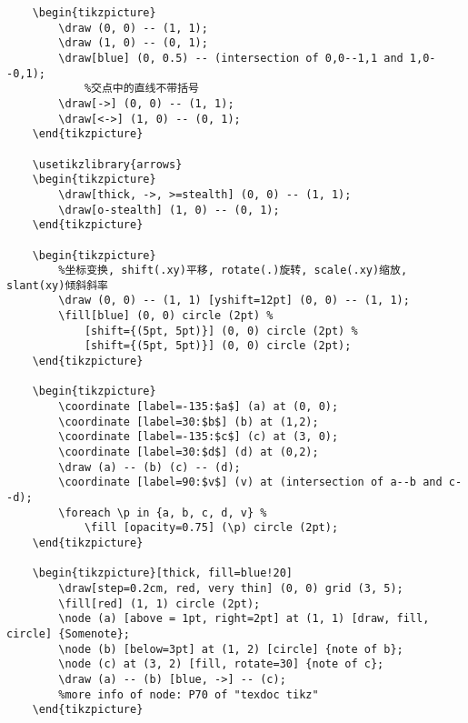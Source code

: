 \documentclass[12pt]{ctexart}
\begin{document}
\begin{verbatim}
    \begin{tikzpicture}
        \draw (0, 0) -- (1, 1);
        \draw (1, 0) -- (0, 1);
        \draw[blue] (0, 0.5) -- (intersection of 0,0--1,1 and 1,0--0,1);
            %交点中的直线不带括号
        \draw[->] (0, 0) -- (1, 1);
        \draw[<->] (1, 0) -- (0, 1);
    \end{tikzpicture}

    \usetikzlibrary{arrows}
    \begin{tikzpicture}
        \draw[thick, ->, >=stealth] (0, 0) -- (1, 1);
        \draw[o-stealth] (1, 0) -- (0, 1);
    \end{tikzpicture}

    \begin{tikzpicture}
        %坐标变换, shift(.xy)平移, rotate(.)旋转, scale(.xy)缩放, slant(xy)倾斜斜率
        \draw (0, 0) -- (1, 1) [yshift=12pt] (0, 0) -- (1, 1);
        \fill[blue] (0, 0) circle (2pt) %
            [shift={(5pt, 5pt)}] (0, 0) circle (2pt) %
            [shift={(5pt, 5pt)}] (0, 0) circle (2pt);
    \end{tikzpicture}

    \begin{tikzpicture}
        \coordinate [label=-135:$a$] (a) at (0, 0);
        \coordinate [label=30:$b$] (b) at (1,2);
        \coordinate [label=-135:$c$] (c) at (3, 0);
        \coordinate [label=30:$d$] (d) at (0,2);
        \draw (a) -- (b) (c) -- (d);
        \coordinate [label=90:$v$] (v) at (intersection of a--b and c--d);
        \foreach \p in {a, b, c, d, v} %
            \fill [opacity=0.75] (\p) circle (2pt);
    \end{tikzpicture}

    \begin{tikzpicture}[thick, fill=blue!20]
        \draw[step=0.2cm, red, very thin] (0, 0) grid (3, 5);
        \fill[red] (1, 1) circle (2pt);
        \node (a) [above = 1pt, right=2pt] at (1, 1) [draw, fill, circle] {Somenote};
        \node (b) [below=3pt] at (1, 2) [circle] {note of b};
        \node (c) at (3, 2) [fill, rotate=30] {note of c};
        \draw (a) -- (b) [blue, ->] -- (c);
        %more info of node: P70 of "texdoc tikz"
    \end{tikzpicture}   
\end{verbatim}
\end{document}
